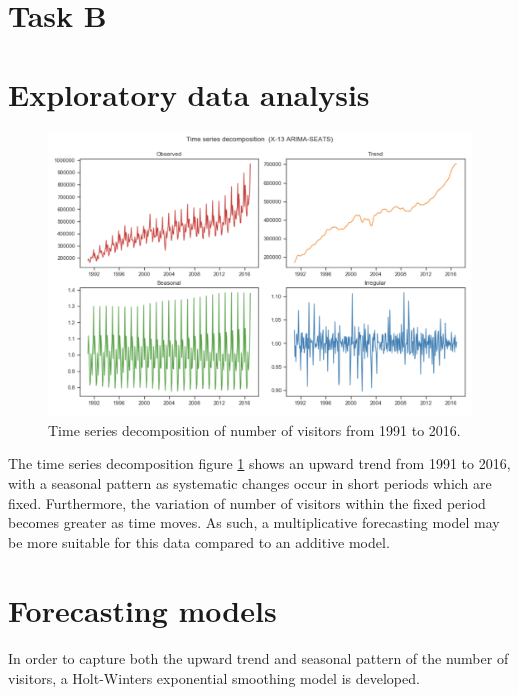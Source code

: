 \documentclass[letterpaper,12pt,twoside,]{pinp}
\begin{document}
\hypertarget{task-b}{%
\section{Task B}\label{task-b}}

\hypertarget{exploratory-data-analysis}{%
\section{Exploratory data analysis}\label{exploratory-data-analysis}}

\begin{figure}
\includegraphics[width=1\linewidth]{decomposition.png}
\centering
\caption{Time series decomposition of number of visitors from 1991 to 2016.}
\label{fig:timeseries}
\end{figure}

The time series decomposition figure \ref{fig:timeseries} shows an
upward trend from 1991 to 2016, with a seasonal pattern as systematic
changes occur in short periods which are fixed. Furthermore, the
variation of number of visitors within the fixed period becomes greater
as time moves. As such, a multiplicative forecasting model may be more
suitable for this data compared to an additive model.

\hypertarget{forecasting-models}{%
\section{Forecasting models}\label{forecasting-models}}

In order to capture both the upward trend and seasonal pattern of the
number of visitors, a Holt-Winters exponential smoothing model is
developed.
\end{document}
